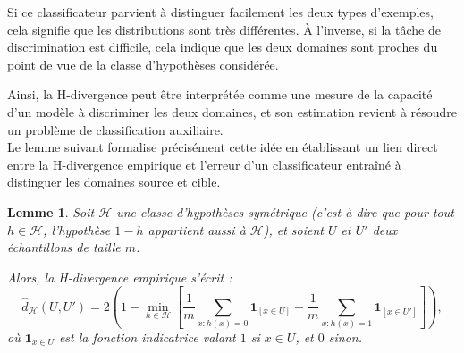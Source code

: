 \documentclass[a4paper,12pt]{article}
\newtheorem{lemma}{Lemme}[section]
\theoremstyle{definition}
\theoremstyle{remark}
\begin{document}
Si ce classificateur parvient à distinguer facilement les deux types d’exemples, cela signifie que les distributions sont très différentes. À l’inverse, si la tâche de discrimination est difficile, cela indique que les deux domaines sont proches du point de vue de la classe d’hypothèses considérée.

Ainsi, la H-divergence peut être interprétée comme une mesure de la capacité d’un modèle à discriminer les deux domaines, et son estimation revient à résoudre un problème de classification auxiliaire.\\



Le lemme suivant formalise précisément cette idée en établissant un lien direct entre la H-divergence empirique et l’erreur d’un classificateur entraîné à distinguer les domaines source et cible.\\




\begin{lemma}
Soit $\mathcal{H}$ une classe d’hypothèses symétrique (c’est-à-dire que pour tout $h \in \mathcal{H}$, l’hypothèse $1 - h$ appartient aussi à $\mathcal{H}$), et soient $U$ et $U'$ deux échantillons de taille $m$.

Alors, la H-divergence empirique s’écrit :
\[
\hat{d}_{\mathcal{H}}(U, U') = 2 \left( 1 - \min_{h \in \mathcal{H}} \left[
\frac{1}{m} \sum_{x : h(x)=0} \mathbf{1}_{[{x \in U}]} + \frac{1}{m} \sum_{x : h(x)=1} \mathbf{1}_{[{x \in U'}]}
\right] \right),
\]
où $\mathbf{1}_{x \in U}$ est la fonction indicatrice valant $1$ si $x \in U$, et $0$ sinon.
\end{lemma}
\end{document}

